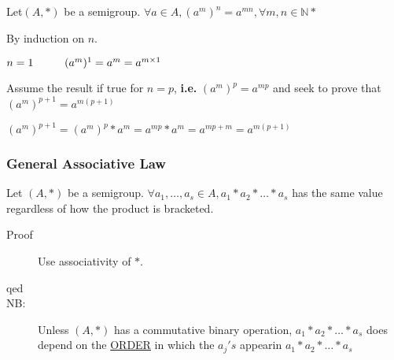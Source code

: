 \documentclass[10pt]{article}
\begin{document}
\begin{description}
\begin{description}
		\end{description}
		\item[Theorem:] Let$(A, *)$ be a semigroup. $\forall a \in A, (a^m)^n = a^{mn}, \forall m, n \in \mathbb{N}*$
		\begin{description}
			\item[Proof:] By induction on $n$.
			\item[Base Case:] $n=1 \hspace{10mm} (a^m)^1 = a^m = a^{m \times 1}$
			\item[Inductive Step:] Assume the result if true for $n=p$, \textbf{i.e.} $(a^m)^p = a^{mp}$ and seek to prove that $(a^m)^{p+1}=a^{m(p+1)}$
			\item $(a^m)^{p+1} = (a^m)^p * a^m = a^{mp} * a^m = a^{mp+m} = a^{m(p+1)}$
		\end{description}
	\end{description}
	
	\subsubsection{General Associative Law}
	Let $(A, *)$ be a semigroup. $\forall a_1, \dots, a_s \in A, a_1 * a_2 * \dots * a_s$ has the same value regardless of how the product is bracketed.
	\begin{description}
		\item[Proof] Use associativity of $*$.
		\item[qed]
		\item[NB:] Unless $(A, *)$ has a commutative binary operation, $a_1 * a_2 * \dots * a_s$ does depend on the \underline{ORDER} in which the $a_j's$ appearin $a_1 * a_2 * \dots * a_s$
	\end{description}
	
\end{document}

